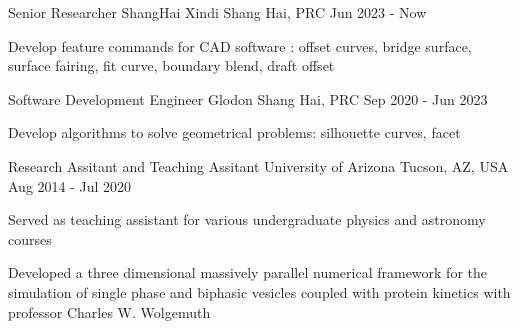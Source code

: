 
  \cventry
    {Senior Researcher} %
    {ShangHai Xindi} %
    {Shang Hai, PRC} %
    {Jun 2023 - Now} %
    {
      \begin{cvitems} %
         \item {Develop feature commands for CAD software : offset curves, bridge surface, surface fairing, fit curve, boundary blend, draft offset}    
      \end{cvitems}
    }  
  
  \cventry
    {Software Development Engineer} %
    {Glodon} %
    {Shang Hai, PRC} %
    {Sep 2020 - Jun 2023} %
    {
      \begin{cvitems} %
         \item {Develop algorithms to solve geometrical problems: silhouette curves, facet}    
      \end{cvitems}
    }
    
  \cventry
    {Research Assitant and Teaching Assitant} %
    {University of Arizona} %
    {Tucson, AZ, USA} %
    {Aug 2014 - Jul 2020} %
    {
      \begin{cvitems} %
         \item {Served as teaching assistant for various undergraduate physics and astronomy courses}
         \item {Developed a three dimensional massively parallel numerical framework for the simulation of single phase and biphasic vesicles coupled with protein kinetics with professor Charles W. Wolgemuth}
      \end{cvitems}
    }
  

